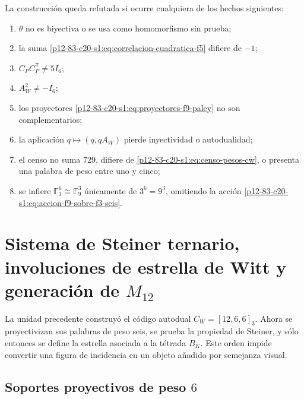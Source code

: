 \begin{criterion}
La construcción queda refutada si ocurre cualquiera de los hechos
siguientes:
\begin{enumerate}
 \item \(\theta\) no es biyectiva o se usa como homomorfismo sin prueba;
 \item la suma \eqref{p12-83-c20-s1:eq:correlacion-cuadratica-f5} difiere de \(-1\);
 \item \(C_PC_P^{\mathsf T}\neq5I_6\);
 \item \(A_W^2\neq-I_6\);
 \item los proyectores \eqref{p12-83-c20-s1:eq:proyectores-f9-paley} no son
       complementarios;
 \item la aplicación \(q\mapsto(q,qA_W)\) pierde inyectividad o
       autodualidad;
 \item el censo no suma \(729\), difiere de
       \eqref{p12-83-c20-s1:eq:censo-pesos-cw}, o presenta una palabra de peso entre uno
       y cinco;
 \item se infiere \(\mathbb F_3^6\cong\mathbb F_9^3\) únicamente de
       \(3^6=9^3\), omitiendo la acción \eqref{p12-83-c20-s1:eq:accion-f9-sobre-f3-seis}.
\end{enumerate}
\end{criterion}



\section{Sistema de Steiner ternario, involuciones de estrella de Witt y generación de \texorpdfstring{\(M_{12}\)}{M12}}
\label{p12-83-c20-s2:chap:sistema-witt-estrellas-m12}

La unidad precedente construyó el código autodual
\(C_W=[12,6,6]_3\). Ahora se proyectivizan sus palabras de peso seis,
se prueba la propiedad de Steiner, y sólo entonces se define la estrella
asociada a la tétrada \(B_K\). Este orden impide convertir una figura de
incidencia en un objeto añadido por semejanza visual.

\subsection{Soportes proyectivos de peso \(6\)}

